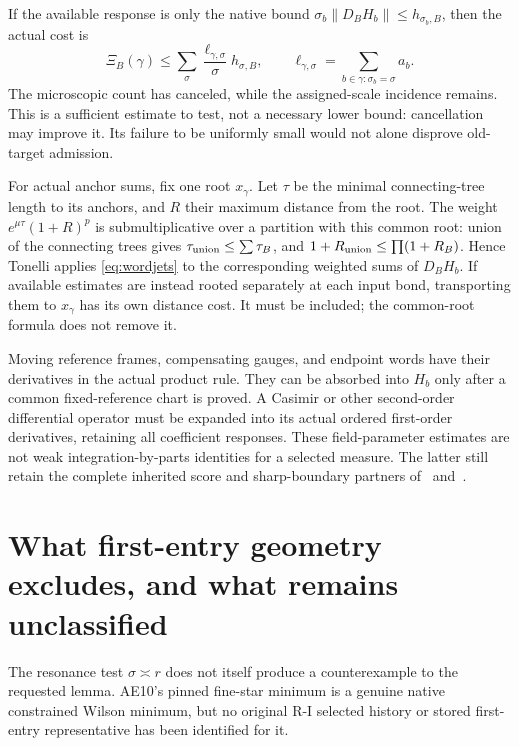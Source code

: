 \documentclass[11pt,letterpaper]{article}
\theoremstyle{plain}
\theoremstyle{remark}\newtheorem{remark}[theorem]{Scope}
\newcommand{\norm}[1]{\left\lVert#1\right\rVert}
\begin{document}
If the available response is only the native bound
$\sigma_b\norm{D_BH_b}\le h_{\sigma_b,B}$, then the actual cost is
\begin{equation}
 \Xi_B(\gamma)
 \le\sum_\sigma\frac{\ell_{\gamma,\sigma}}{\sigma}
                       h_{\sigma,B},
 \qquad
 \ell_{\gamma,\sigma}
 =\sum_{b\in\gamma:\sigma_b=\sigma}a_b.
 \label{eq:wordcost}
\end{equation}
The microscopic count has canceled, while the assigned-scale incidence
remains. This is a sufficient estimate to test, not a necessary lower
bound: cancellation may improve it. Its failure to be uniformly small
would not alone disprove old-target admission.

For actual anchor sums, fix one root $x_\gamma$. Let $\tau$ be the minimal
connecting-tree length to its anchors, and $R$ their maximum distance
from the root. The weight $e^{\mu\tau}(1+R)^p$ is submultiplicative
over a partition with this common root: union of the connecting trees gives
$\tau_{\rm union}\le\sum\tau_B$, and
$1+R_{\rm union}\le\prod(1+R_B)$. Hence Tonelli applies
\eqref{eq:wordjets} to the corresponding weighted sums of $D_BH_b$.
If available estimates are instead rooted separately at each input bond,
transporting them to $x_\gamma$ has its own distance cost. It must be
included; the common-root formula does not remove it.

Moving reference frames, compensating gauges, and endpoint words have
their derivatives in the actual product rule. They can be absorbed into
$H_b$ only after a common fixed-reference chart is proved. A Casimir or
other second-order differential operator must be expanded into its actual
ordered first-order derivatives, retaining all coefficient responses.
These field-parameter estimates are not weak integration-by-parts identities
for a selected measure. The latter still retain the complete inherited
score and sharp-boundary partners of~\cite[pp.~1200--1204]{W} and~\cite[\S5]{CE}.

\section{What first-entry geometry excludes, and what remains unclassified}

The resonance test $\sigma\asymp r$ does not itself produce a counterexample
to the requested lemma. AE10's pinned fine-star minimum is a genuine native
constrained Wilson minimum, but no original R-I selected history or stored
first-entry representative has been identified for it.
\end{document}
